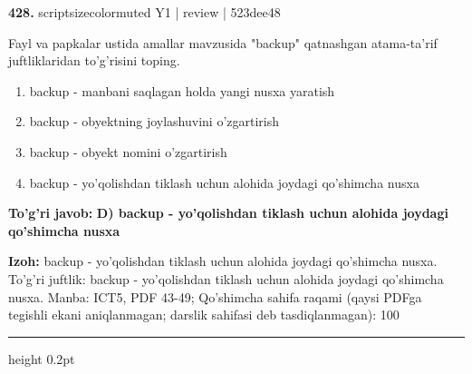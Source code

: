 \documentclass[10pt,a4paper]{article}
\begin{document}
{\bfseries\sffamily\color{ink} 428.} {scriptsizecolor{muted} Y1 | review | 523dee48}
\par
Fayl va papkalar ustida amallar mavzusida "backup" qatnashgan atama-ta'rif juftliklaridan to'g'risini toping.
\begin{enumerate}[label=\Alph*),leftmargin=9mm]
\item backup - manbani saqlagan holda yangi nusxa yaratish
\item backup - obyektning joylashuvini o'zgartirish
\item backup - obyekt nomini o'zgartirish
\item backup - yo'qolishdan tiklash uchun alohida joydagi qo'shimcha nusxa
\end{enumerate}
\begin{tcolorbox}[enhanced,breakable,colback=teal!4,colframe=teal!60!black,boxrule=0.45pt,arc=1.2mm,left=2.7mm,right=2.7mm,top=1.8mm,bottom=1.8mm,before skip=2mm,after skip=2mm]
{\bfseries\sffamily\color{teal}To'g'ri javob:} \textbf{D) backup - yo'qolishdan tiklash uchun alohida joydagi qo'shimcha nusxa}
\par\smallskip
{\bfseries Izoh:} backup - yo'qolishdan tiklash uchun alohida joydagi qo'shimcha nusxa. To'g'ri juftlik: backup - yo'qolishdan tiklash uchun alohida joydagi qo'shimcha nusxa. Manba: ICT5, PDF 43-49; Qo'shimcha sahifa raqami (qaysi PDFga tegishli ekani aniqlanmagan; darslik sahifasi deb tasdiqlanmagan): 100
\end{tcolorbox}
\vspace{2mm}\hrule height 0.2pt\vspace{3mm}
\end{document}
